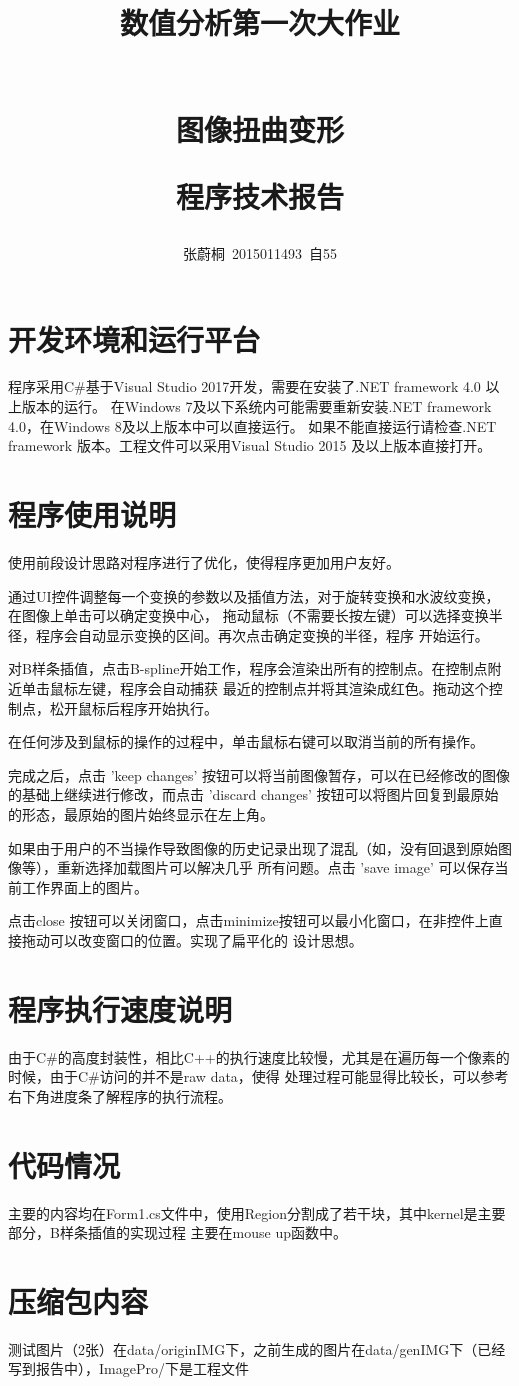 \documentclass[UTF8,a4paper]{paper}\usepackage[utf8]{inputenc}\usepackage{algorithm}
\title{\begin{large}数值分析第一次大作业\end{large}\\ 图像扭曲变形
\\ \begin{large}程序技术报告\end{large}}
\author{张蔚桐\ 2015011493\ 自55}
\begin{document}
\maketitle
\section{开发环境和运行平台}
程序采用C\#基于Visual Studio 2017开发，需要在安装了.NET framework 4.0 以上版本的运行。
在Windows 7及以下系统内可能需要重新安装.NET framework 4.0，在Windows 8及以上版本中可以直接运行。
如果不能直接运行请检查.NET framework 版本。工程文件可以采用Visual Studio 2015 及以上版本直接打开。
\section{程序使用说明}
使用前段设计思路对程序进行了优化，使得程序更加用户友好。

通过UI控件调整每一个变换的参数以及插值方法，对于旋转变换和水波纹变换，在图像上单击可以确定变换中心，
拖动鼠标（不需要长按左键）可以选择变换半径，程序会自动显示变换的区间。再次点击确定变换的半径，程序
开始运行。

对B样条插值，点击B-spline开始工作，程序会渲染出所有的控制点。在控制点附近单击鼠标左键，程序会自动捕获
最近的控制点并将其渲染成红色。拖动这个控制点，松开鼠标后程序开始执行。

在任何涉及到鼠标的操作的过程中，单击鼠标右键可以取消当前的所有操作。

完成之后，点击 'keep changes' 按钮可以将当前图像暂存，可以在已经修改的图像的基础上继续进行修改，而点击
'discard changes' 按钮可以将图片回复到最原始的形态，最原始的图片始终显示在左上角。

如果由于用户的不当操作导致图像的历史记录出现了混乱（如，没有回退到原始图像等），重新选择加载图片可以解决几乎
所有问题。点击 'save image' 可以保存当前工作界面上的图片。

点击close 按钮可以关闭窗口，点击minimize按钮可以最小化窗口，在非控件上直接拖动可以改变窗口的位置。实现了扁平化的
设计思想。
\section{程序执行速度说明}
由于C\#的高度封装性，相比C++的执行速度比较慢，尤其是在遍历每一个像素的时候，由于C\#访问的并不是raw data，使得
处理过程可能显得比较长，可以参考右下角进度条了解程序的执行流程。
\section{代码情况}
主要的内容均在Form1.cs文件中，使用Region分割成了若干块，其中kernel是主要部分，B样条插值的实现过程
主要在mouse up函数中。
\section{压缩包内容}
测试图片（2张）在data/originIMG下，之前生成的图片在data/genIMG下（已经写到报告中），ImagePro/下是工程文件
\end{document}
